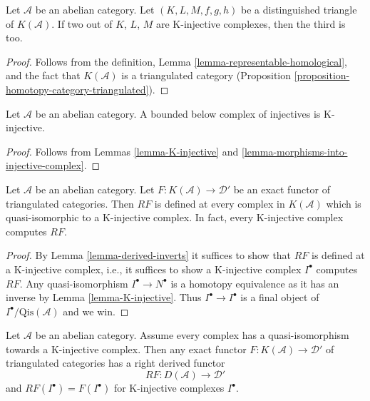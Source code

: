 \begin{lemma}
\label{lemma-triangle-K-injective}
Let $\mathcal{A}$ be an abelian category. Let $(K, L, M, f, g, h)$
be a distinguished triangle of $K(\mathcal{A})$. If two out of
$K$, $L$, $M$ are K-injective complexes, then the third is too.
\end{lemma}

\begin{proof}
Follows from the definition,
Lemma \ref{lemma-representable-homological}, and
the fact that $K(\mathcal{A})$ is a triangulated category
(Proposition \ref{proposition-homotopy-category-triangulated}).
\end{proof}

\begin{lemma}
\label{lemma-bounded-below-injectives-K-injective}
Let $\mathcal{A}$ be an abelian category. A bounded below complex of
injectives is K-injective.
\end{lemma}

\begin{proof}
Follows from
Lemmas \ref{lemma-K-injective} and
\ref{lemma-morphisms-into-injective-complex}.
\end{proof}

\begin{lemma}
\label{lemma-K-injective-defined}
Let $\mathcal{A}$ be an abelian category.
Let $F : K(\mathcal{A}) \to \mathcal{D}'$ be an exact functor
of triangulated categories. Then $RF$ is defined at every complex
in $K(\mathcal{A})$ which is quasi-isomorphic to a
K-injective complex. In fact, every K-injective complex computes $RF$.
\end{lemma}

\begin{proof}
By
Lemma \ref{lemma-derived-inverts}
it suffices to show that $RF$ is defined at a K-injective complex,
i.e., it suffices to show a K-injective complex $I^\bullet$ computes $RF$.
Any quasi-isomorphism $I^\bullet \to N^\bullet$ is a homotopy equivalence
as it has an inverse by
Lemma \ref{lemma-K-injective}.
Thus $I^\bullet \to I^\bullet$ is a final object of
$I^\bullet/\text{Qis}(\mathcal{A})$ and we win.
\end{proof}

\begin{lemma}
\label{lemma-enough-K-injectives-implies}
Let $\mathcal{A}$ be an abelian category.
Assume every complex has a quasi-isomorphism towards a K-injective complex.
Then any exact functor $F : K(\mathcal{A}) \to \mathcal{D}'$ of triangulated
categories has a right derived functor
$$
RF : D(\mathcal{A}) \longrightarrow \mathcal{D}'
$$
and $RF(I^\bullet) = F(I^\bullet)$ for K-injective complexes $I^\bullet$.
\end{lemma}

